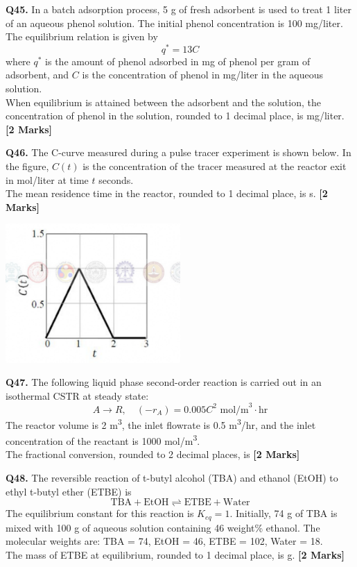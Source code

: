 \documentclass[11pt]{article}
\newcommand{\questionb}[2]{
    \noindent\textbf{Q#2.} #1 \hfill \textbf{[2 Marks]}
}
\begin{document}
\questionb{In a batch adsorption process, 5 g of fresh adsorbent is used to treat 1 liter of an aqueous phenol solution. The initial phenol concentration is 100 mg/liter. The equilibrium relation is given by  
\[
q^* = 13C
\]  
where \( q^* \) is the amount of phenol adsorbed in mg of phenol per gram of adsorbent, and \( C \) is the concentration of phenol in mg/liter in the aqueous solution.  
\\ When equilibrium is attained between the adsorbent and the solution, the concentration of phenol in the solution, rounded to 1 decimal place, is mg/liter.}{45}
\vspace{0.5cm}

\questionb{The C-curve measured during a pulse tracer experiment is shown below. In the figure, \( C(t) \) is the concentration of the tracer measured at the reactor exit in mol/liter at time \( t \) seconds.  
\\ The mean residence time in the reactor, rounded to 1 decimal place, is s.}{46}
\begin{center}
\includegraphics[width=0.5\textwidth]{figures/46.png}
\end{center}
\vspace{0.5cm}

\questionb{The following liquid phase second-order reaction is carried out in an isothermal CSTR at steady state:  
\[
A \rightarrow R, \quad (-r_A) = 0.005 C^2 \text{ mol/m}^3\cdot\text{hr}
\]  
The reactor volume is 2 m\textsuperscript{3}, the inlet flowrate is 0.5 m\textsuperscript{3}/hr, and the inlet concentration of the reactant is 1000 mol/m\textsuperscript{3}.  
\\ The fractional conversion, rounded to 2 decimal places, is}{47}
\vspace{0.5cm}

\questionb{The reversible reaction of t-butyl alcohol (TBA) and ethanol (EtOH) to ethyl t-butyl ether (ETBE) is  
\[
\text{TBA} + \text{EtOH} \rightleftharpoons \text{ETBE} + \text{Water}
\]  
The equilibrium constant for this reaction is \( K_{eq} = 1 \). Initially, 74 g of TBA is mixed with 100 g of aqueous solution containing 46 weight\% ethanol. The molecular weights are: TBA = 74, EtOH = 46, ETBE = 102, Water = 18.  
\\ The mass of ETBE at equilibrium, rounded to 1 decimal place, is g.}{48}
\vspace{0.5cm}
\end{document}
